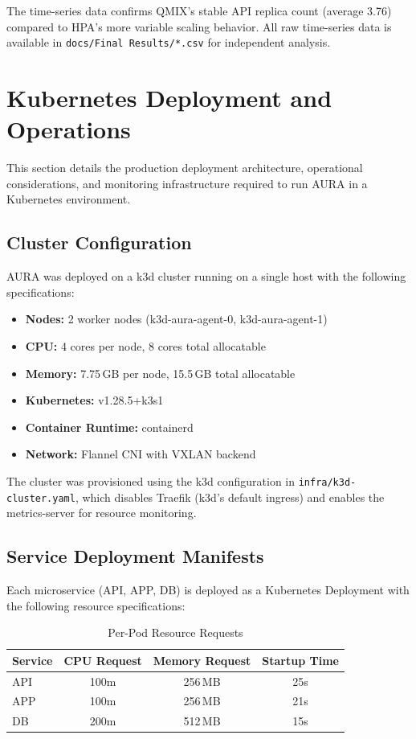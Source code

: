 \documentclass[conference]{IEEEtran}
\begin{document}
The time-series data confirms QMIX's stable API replica count
(average 3.76) compared to HPA's more variable scaling behavior.
All raw time-series data is available in
\texttt{docs/Final Results/*.csv} for independent analysis.
\section{Kubernetes Deployment and Operations}
\label{sec:k8s-deployment}

This section details the production deployment architecture, operational
considerations, and monitoring infrastructure required to run AURA in a
Kubernetes environment.

\subsection{Cluster Configuration}

AURA was deployed on a k3d cluster running on a single host with the
following specifications:
\begin{itemize}
\item \textbf{Nodes:} 2 worker nodes (k3d-aura-agent-0, k3d-aura-agent-1)
\item \textbf{CPU:} 4 cores per node, 8 cores total allocatable
\item \textbf{Memory:} 7.75\,GB per node, 15.5\,GB total allocatable
\item \textbf{Kubernetes:} v1.28.5+k3s1
\item \textbf{Container Runtime:} containerd
\item \textbf{Network:} Flannel CNI with VXLAN backend
\end{itemize}

The cluster was provisioned using the k3d configuration in
\texttt{infra/k3d-cluster.yaml}, which disables Traefik (k3d's default
ingress) and enables the metrics-server for resource monitoring.

\subsection{Service Deployment Manifests}

Each microservice (API, APP, DB) is deployed as a Kubernetes Deployment
with the following resource specifications:

\begin{table}[h]
\centering
\caption{Per-Pod Resource Requests}
\label{tab:pod-resources}
\setlength{\tabcolsep}{6pt}
\begin{tabular}{lccc}
\toprule
\textbf{Service} & \textbf{CPU Request} & \textbf{Memory Request} & \textbf{Startup Time} \\
\midrule
API & 100m & 256\,MB & 25s \\
APP & 100m & 256\,MB & 21s \\
DB & 200m & 512\,MB & 15s \\
\bottomrule
\end{tabular}
\end{table}
\end{document}
